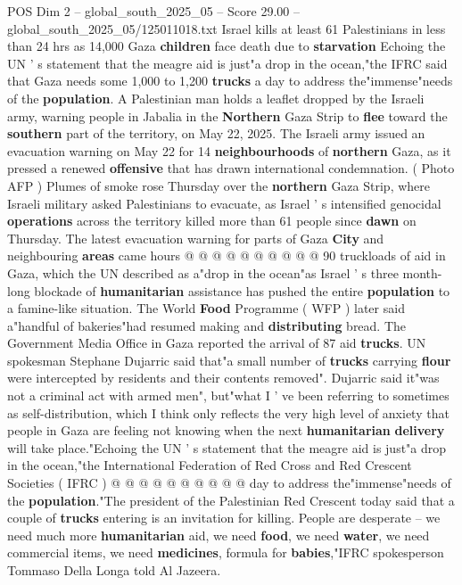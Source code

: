 \begin{textsample}{POS Dim 2 – global\_south\_2025\_05 – Score 29.00 – global\_south\_2025\_05/125011018.txt}  \label{ex:f2_pos_042}
Israel kills at least 61 Palestinians in less than 24 hrs as 14,000 Gaza \textbf{children} face death due to \textbf{starvation} Echoing the UN ' s statement that the meagre aid is just"a drop in the ocean,"the IFRC said that Gaza needs some 1,000 to 1,200 \textbf{trucks} a day to address the"immense"needs of the \textbf{population}.
A Palestinian man holds a leaflet dropped by the Israeli army, warning people in Jabalia in the \textbf{Northern} Gaza Strip to \textbf{flee} toward the \textbf{southern} part of the territory, on May 22, 2025.
The Israeli army issued an evacuation warning on May 22 for 14 \textbf{neighbourhoods} of \textbf{northern} Gaza, as it pressed a renewed \textbf{offensive} that has drawn international condemnation. ( Photo AFP ) Plumes of smoke rose Thursday over the \textbf{northern} Gaza Strip, where Israeli military asked Palestinians to evacuate, as Israel ' s intensified genocidal \textbf{operations} across the territory killed more than 61 people since \textbf{dawn} on Thursday.
The latest evacuation warning for parts of Gaza \textbf{City} and neighbouring \textbf{areas} came hours @ @ @ @ @ @ @ @ @ @ 90 truckloads of aid in Gaza, which the UN described as a"drop in the ocean"as Israel ' s three month-long blockade of \textbf{humanitarian} assistance has pushed the entire \textbf{population} to a famine-like situation.
The World \textbf{Food} Programme ( WFP ) later said a"handful of bakeries"had resumed making and \textbf{distributing} bread.
The Government Media Office in Gaza reported the arrival of 87 aid \textbf{trucks}.
UN spokesman Stephane Dujarric said that"a small number of \textbf{trucks} carrying \textbf{flour} were intercepted by residents and their contents removed".
Dujarric said it"was not a criminal act with armed men", but"what I ' ve been referring to sometimes as self-distribution, which I think only reflects the very high level of anxiety that people in Gaza are feeling not knowing when the next \textbf{humanitarian} \textbf{delivery} will take place."Echoing the UN ' s statement that the meagre aid is just"a drop in the ocean,"the International Federation of Red Cross and Red Crescent Societies ( IFRC ) @ @ @ @ @ @ @ @ @ @ day to address the"immense"needs of the \textbf{population}."The president of the Palestinian Red Crescent today said that a couple of \textbf{trucks} entering is an invitation for killing.
People are desperate -- we need much more \textbf{humanitarian} aid, we need \textbf{food}, we need \textbf{water}, we need commercial items, we need \textbf{medicines}, formula for \textbf{babies},"IFRC spokesperson Tommaso Della Longa told Al Jazeera.

\end{textsample}
